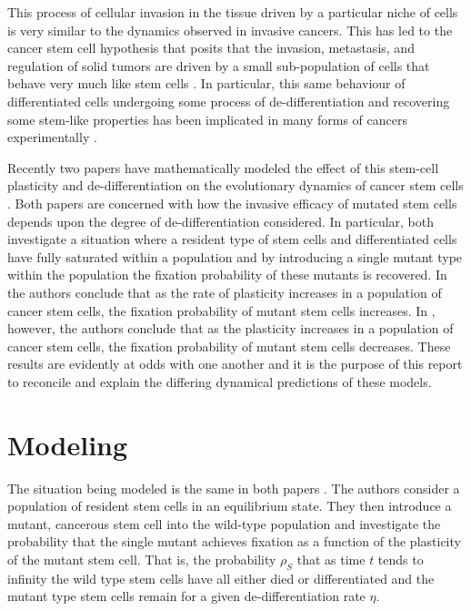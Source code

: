 \documentclass[12pt]{article}
\begin{document}
This process of cellular invasion in the tissue driven by a particular niche of cells is very similar to the dynamics observed in invasive cancers. This has led to the cancer stem cell hypothesis that posits that the invasion, metastasis, and regulation of solid tumors are driven by a small sub-population of cells that behave very much like stem cells \cite{moh3, moh4, moh5, moh6}. In particular, this same behaviour of differentiated cells undergoing some process of de-differentiation and recovering some stem-like properties has been implicated in many forms of cancers experimentally \cite{moh23, moh24, moh25, moh26}.

Recently two papers have mathematically modeled the effect of this stem-cell plasticity and de-differentiation on the evolutionary dynamics of cancer stem cells \cite{mohammad,wodarz}. Both papers are concerned with how the invasive efficacy of mutated stem cells depends upon the degree of de-differentiation considered. In particular, both investigate a situation where a resident type of stem cells and differentiated cells have fully saturated within a population and by introducing a single mutant type within the population the fixation probability of these mutants is recovered. In \cite{mohammad} the authors conclude that as the rate of plasticity increases in a population of cancer stem cells, the fixation probability of mutant stem cells increases. In \cite{wodarz}, however, the authors conclude that as the plasticity increases in a population of cancer stem cells, the fixation probability of mutant stem cells decreases. These results are evidently at odds with one another and it is the purpose of this report to reconcile and explain the differing dynamical predictions of these models.
\section{Modeling}

The situation being modeled is the same in both papers \cite{mohammad, wodarz}. The authors consider a population of resident stem cells in an equilibrium state. They then introduce a mutant, cancerous stem cell into the wild-type population and investigate the probability that the single mutant achieves fixation as a function of the plasticity of the mutant stem cell. That is, the probability $\rho_S$ that as time $t$ tends to infinity the wild type stem cells have all either died or differentiated and the mutant type stem cells remain for a given de-differentiation rate $\eta$.
\end{document}
